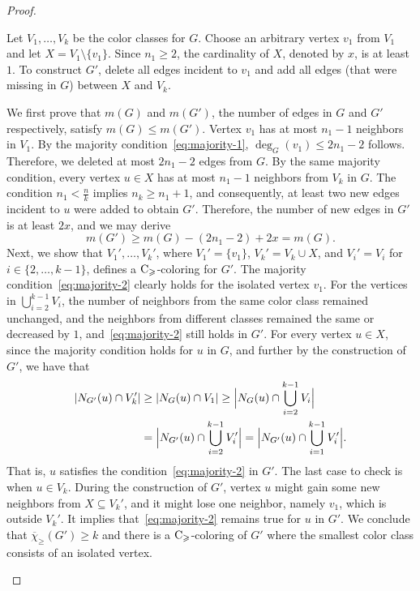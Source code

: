 \documentclass{article}
\theoremstyle{definition}
\newcommand{\mc}{\overline{\chi}_{\geqslant}}
\newcommand{\cg}{{\rm C}_{\geqslant}}
\begin{document}
\begin{proof}
\begin{description}
       Let $V_1, \dots, V_k$ be the color classes for $G$. Choose an arbitrary vertex $v_1$ from $V_1$ and let $X=V_1 \setminus \{v_1\}$. Since $n_1 \ge 2$, the cardinality of $X$, denoted by $x$, is at least $1$. To construct $G'$, delete all edges incident to $v_1$ and add all edges (that were missing in $G$) between $X$ and $V_k$. 

       We first prove that $m(G)$ and $m(G')$, the number of edges in $G$ and $G'$ respectively, satisfy $m(G) \leq m(G')$. Vertex $v_1 $ has at most $n_1-1$ neighbors in $V_1$. By the majority condition~\eqref{eq:majority-1}, $\deg_G(v_1) \leq 2n_1-2$ follows. Therefore, we deleted at most $2n_1-2$ edges from $G$. By the same majority condition, every vertex $u \in X$ has at most $n_1-1$ neighbors from $V_k$ in $G$. The condition $n_1 < \frac{n}{k}$ implies $n_k \ge n_1+1$, and consequently, at least two new edges incident to $u$ were added to obtain $G'$. Therefore, the number of new edges in $G'$ is at least $2x$, and we may derive 
       $$m(G') \ge m(G) -(2n_1-2) + 2x = m(G). 
       $$
       Next, we show that $V_1', \dots, V_k'$, where $V_1'=\{v_1\}$, $V_k'=V_k \cup X$, and $V_i'=V_i$ for $i\in \{2, \dots, k-1\}$, defines a $\cg$-coloring for $G'$. The majority condition~\eqref{eq:majority-2} clearly holds for the isolated vertex $v_1$. For the vertices in $\bigcup_{i=2}^{k-1} V_i$, the number of neighbors from the same color class remained unchanged, and the neighbors from different classes remained the same or decreased by $1$, and~\eqref{eq:majority-2} still holds in $G'$. For every vertex $u \in X$, since the majority condition holds for $u$ in $G$, and further by the construction of $G'$, we have that
       \begin{align*}
           |N_{G'}(u) \cap V_k'| &\ge |N_{G}(u) \cap V_1 | \ge \Bigl|N_{G}(u) \cap \bigcup_{i=2}^{k-1} V_i \Bigr|\\
           &= \Bigl|N_{G'}(u) \cap \bigcup_{i=2}^{k-1} V_i' \Bigr|
       = \Bigl|N_{G'}(u) \cap \bigcup_{i=1}^{k-1} V_i' \Bigr|.
       \end{align*}
       That is, $u$ satisfies the condition~\eqref{eq:majority-2} in $G'$. The last case to check is when $u \in V_k$. During the construction of $G'$, vertex $u$ might gain some new neighbors from $X \subseteq V_k'$, and it might lose one neighbor, namely $v_1$, which is outside $V_k'$. It implies that~\eqref{eq:majority-2} remains true for $u$ in $G'$. We conclude that $\mc(G') \ge k$ and there is a $\cg$-coloring of $G'$ where the smallest color class consists of an isolated vertex.


\end{description}
\end{proof}
\end{document}
